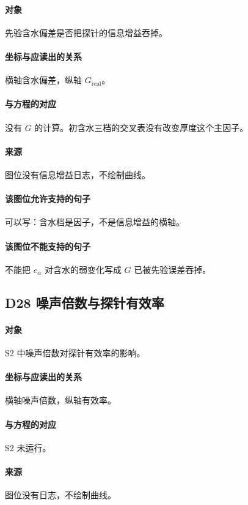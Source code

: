 \paragraph{对象}
先验含水偏差是否把探针的信息增益吞掉。

\paragraph{坐标与应读出的关系}
横轴含水偏差，纵轴 $G_{\mathrm{real}}$。

\paragraph{与方程的对应}
没有 $G$ 的计算。初含水三档的交叉表没有改变厚度这个主因子。

\paragraph{来源}
图位没有信息增益日志，不绘制曲线。

\paragraph{该图位允许支持的句子}
可以写：含水档是因子，不是信息增益的横轴。

\paragraph{该图位不能支持的句子}
不能把 $e_\alpha$ 对含水的弱变化写成 $G$ 已被先验误差吞掉。

\subsection{D28 噪声倍数与探针有效率}
\paragraph{对象}
S2 中噪声倍数对探针有效率的影响。

\paragraph{坐标与应读出的关系}
横轴噪声倍数，纵轴有效率。

\paragraph{与方程的对应}
S2 未运行。

\paragraph{来源}
图位没有日志，不绘制曲线。

